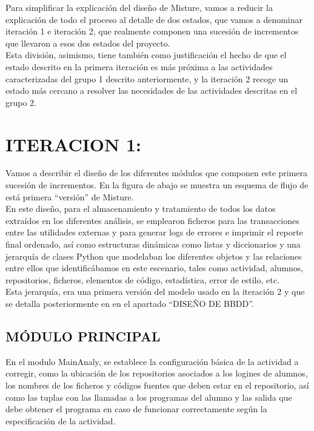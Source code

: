 Para simplificar la explicación del diseño de Misture, vamos a reducir la explicación de todo el proceso al detalle de dos estados, que vamos a denominar iteración 1 e iteración 2, que realmente componen una sucesión de incrementos que llevaron a esos dos estados del proyecto.\\


Esta división, asimismo, tiene también como justificación el hecho de que el estado descrito en la primera iteración es más próxima a las actividades caracterizadas del grupo 1 descrito anteriormente, y la iteración 2 recoge un estado más cercano a resolver las necesidades de las actividades descritas en el grupo 2.

\section{ITERACION 1:}

Vamos a describir el diseño de los diferentes módulos que componen este primera sucesión de incrementos. En la figura de abajo se muestra un esquema de flujo de está primera ``versión'' de Misture.\\


En este diseño, para el almacenamiento y tratamiento de todos los datos extraídos en los diferentes análisis, se emplearon ficheros para las transacciones entre las utilidades externas y para generar logs de errores e imprimir el reporte final ordenado, así como estructuras dinámicas como listas y diccionarios y una jerarquía de clases Python que modelaban los diferentes objetos y las relaciones entre ellos que identificábamos en este escenario, tales como actividad, alumnos, repositorios, ficheros, elementos de código, estadística, error de estilo, etc.\\


Esta jerarquía, era una primera versión del modelo usado en la iteración 2 y que se detalla posteriormente en en el apartado ``DISEÑO DE BBDD''.

\subsection{MÓDULO PRINCIPAL}

En el modulo MainAnaly, se establece la configuración básica de la actividad a corregir, como la ubicación de los repositorios asociados a los logines de alumnos, los nombres de los ficheros y códigos fuentes que deben estar en el repositorio, así como las tuplas con las llamadas a los programas del alumno y las salida que debe obtener el programa en caso de funcionar correctamente según la especificación de la actividad.\\


